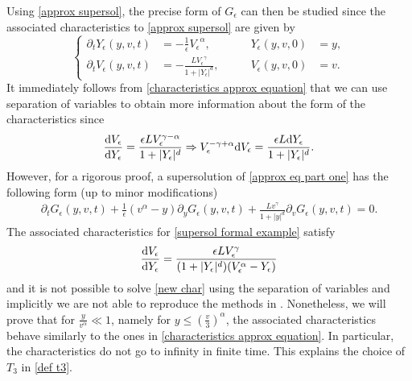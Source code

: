 \documentclass[11pt]{article}
\numberwithin{equation}{section}
\newcommand{\der}{\textup{d}}
\begin{document}
Using \eqref{approx supersol}, the precise form of $G_{\epsilon}$ can then be studied since the associated characteristics
to \eqref{approx supersol} are given by
 \begin{equation}
\left\{\begin{aligned}\label{characteristics approx equation}
\partial_{t}{Y_{\epsilon}}(y,v,t)&=-\frac{1}{\epsilon}{V_{\epsilon}}^{\alpha}, & \qquad {Y_{\epsilon}}(y,v,0)&=y, \\
\partial_{t}{V_{\epsilon}}(y,v,t)&=-\frac{{L}{V_{\epsilon}}^{\gamma}}{1+|{Y_{\epsilon}}|^{d}},& \qquad {V_{\epsilon}}(y,v,0)&=v.
   \end{aligned}\right.
   \end{equation}
  It immediately follows from \eqref{characteristics approx equation} that we can use separation of variables to obtain more information about the form of the characteristics since
  \begin{align*}
      \frac{\der V_{\epsilon}}{\der Y_{\epsilon}}=\frac{\epsilon L V_{\epsilon}^{\gamma-\alpha}}{1+|Y_{\epsilon}|^{d}}\Rightarrow V_{\epsilon}^{-\gamma+\alpha}\der V_{\epsilon}=\frac{\epsilon L \der Y_{\epsilon}}{1+|Y_{\epsilon}|^{d}}.
  \end{align*}
 However, for a rigorous proof, a supersolution of \eqref{approx eq part one} has the following form (up to minor modifications)
 \begin{align}\label{supersol formal example}
    \partial_{t}G_{\epsilon}(y,v,t)+\frac{1}{\epsilon}(v^{\alpha}-y)\partial_{y}G_{\epsilon}(y,v,t)+\frac{L v^{\gamma} }{1+|y|^{d}}\partial_{v}G_{\epsilon}(y,v,t)=0. \end{align} The associated characteristics for \eqref{supersol formal example} satisfy
  \begin{align}\label{new char}
      \frac{\der V_{\epsilon}}{\der Y_{\epsilon}}=\frac{\epsilon L V_{\epsilon}^{\gamma}}{(1+|Y_{\epsilon}|^{d})(V_{\epsilon}^{\alpha}-Y_{\epsilon})}
  \end{align}
  and it is not possible to solve \eqref{new char} using the separation of variables and implicitly we are not able to reproduce the methods in \cite{cristianinhom}. Nonetheless, we will prove that for  $\frac{y}{v^{\alpha}}\ll 1$, namely for $y\leq (\frac{v}{3})^{\alpha}$, the associated characteristics behave similarly to the ones in \eqref{characteristics approx equation}. In particular, the characteristics do not go to infinity in finite time. This explains the choice of $T_{3}$ in \eqref{def t3}.
\end{document}
